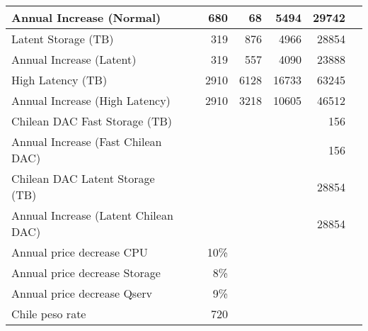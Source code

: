 \begin{longtable} { |p{}  |r  |r  |r  |r  |r  |r |}
{Annual Increase (Normal)}&{}&{680}&{68}&{5494}&{29742} \\ \hline
{Latent Storage  (TB)}&{}&{319}&{876}&{4966}&{28854} \\ \hline
{Annual Increase (Latent)}&{}&{319}&{557}&{4090}&{23888} \\ \hline
{High Latency (TB)}&{}&{2910}&{6128}&{16733}&{63245} \\ \hline
{Annual Increase (High Latency)}&{}&{2910}&{3218}&{10605}&{46512} \\ \hline
{Chilean DAC Fast Storage (TB)}&{}&{}&{}&{}&{156} \\ \hline
{Annual Increase (Fast Chilean DAC)}&{}&{}&{}&{}&{156} \\ \hline
{Chilean DAC Latent Storage (TB)}&{}&{}&{}&{}&{28854} \\ \hline
{Annual Increase (Latent Chilean DAC)}&{}&{}&{}&{}&{28854} \\ \hline
{Annual price decrease CPU}&{}&{10\%}&{}&{}&{} \\ \hline
{Annual price decrease Storage}&{}&{8\%}&{}&{}&{} \\ \hline
{Annual price decrease Qserv}&{}&{9\%}&{}&{}&{} \\ \hline
{Chile peso rate }&{}&{720}&&& \\ \hline
\end{longtable} \normalsize
